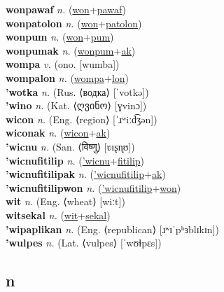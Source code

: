 \textbf{wonpawaf} \textit{n.} (\hyperref[won]{won}+\hyperref[pawaf]{pawaf})
 \label{wonpawaf} \\
\textbf{wonpatolon} \textit{n.} (\hyperref[won]{won}+\hyperref[patolon]{patolon})
 \label{wonpatolon} \\
\textbf{wonpum} \textit{n.} (\hyperref[won]{won}+\hyperref[pum]{pum})
 \label{wonpum} \\
\textbf{wonpumak} \textit{n.} (\hyperref[wonpum]{wonpum}+\hyperref[ak]{ak})
 \label{wonpumak} \\
\textbf{wompa} \textit{v.} (ono. [wumba])
 \label{wompa} \\
\textbf{wompalon} \textit{n.} (\hyperref[wompa]{wompa}+\hyperref[lon]{lon})
 \label{wompalon} \\
\textbf{'wotka} \textit{n.} (Rus. ⟨водка⟩ [ˈvotkə])
 \label{'wotka} \\
\textbf{'wino} \textit{n.} (Kat. ⟨ღვინო⟩ [ɣvinɔ])
 \label{'wino} \\
\textbf{wicon} \textit{n.} (Eng. ⟨region⟩ [ˈɹʷiːd͡ʒən])
 \label{wicon} \\
\textbf{wiconak} \textit{n.} (\hyperref[wicon]{wicon}+\hyperref[ak]{ak})
 \label{wiconak} \\
\textbf{'wicnu} \textit{n.} (San. ⟨विष्णु⟩ [ʋɪʂɳʊ])
 \label{'wicnu} \\
\textbf{'wicnufitilip} \textit{n.} (\hyperref['wicnu]{'wicnu}+\hyperref[fitilip]{fitilip})
 \label{'wicnufitilip} \\
\textbf{'wicnufitilipak} \textit{n.} (\hyperref['wicnufitilip]{'wicnufitilip}+\hyperref[ak]{ak})
 \label{'wicnufitilipak} \\
\textbf{'wicnufitilipwon} \textit{n.} (\hyperref['wicnufitilip]{'wicnufitilip}+\hyperref[won]{won})
 \label{'wicnufitilipwon} \\
\textbf{wit} \textit{n.} (Eng. ⟨wheat⟩ [wiːt])
 \label{wit} \\
\textbf{witsekal} \textit{n.} (\hyperref[wit]{wit}+\hyperref[sekal]{sekal})
 \label{witsekal} \\
\textbf{'wipaplikan} \textit{n.} (Eng. ⟨republican⟩ [ɹʷɪˈpʰɜblɪkɪn])
 \label{'wipaplikan} \\
\textbf{'wulpes} \textit{n.} (Lat. ⟨vulpes⟩ [ˈwʊɫpɛs])
 \label{'wulpes} \\
\subsection{n}

